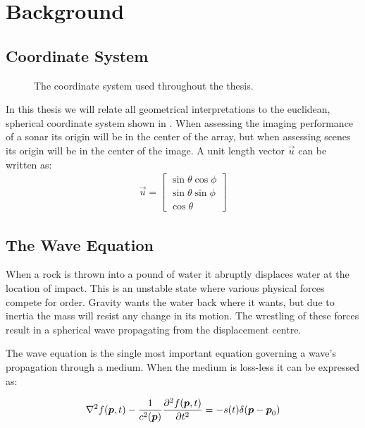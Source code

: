 \chapter{Background}


\section{Coordinate System}

\begin{figure}[th]
\caption{The coordinate system used throughout the thesis.}\label{geometry}
\end{figure}

In this thesis we will relate all geometrical interpretations to the euclidean, spherical coordinate system shown in . When assessing the imaging performance of a sonar its origin will be in the center of the array, but when assessing scenes its origin will be in the center of the image. A unit length vector $\vec u$ can be written as:
%
\begin{align*}
\vec u =
\begin{bmatrix}
\sin\theta \cos\phi \\
\sin\theta \sin\phi \\
\cos\theta
\end{bmatrix}
\end{align*}
%





\section{The Wave Equation}

When a rock is thrown into a pound of water it abruptly displaces water at the location of impact. This is an unstable state where various physical forces compete for order. Gravity wants the water back where it wants, but due to inertia the mass will resist any change in its motion. The wrestling of these forces result in a spherical wave propagating from the displacement centre. 

The wave equation is the single most important equation governing a wave's propagation through a medium. When the medium is loss-less it can be expressed as:

\begin{align*}
\nabla^2 f(\boldsymbol{p},t) - \frac{1}{c^2(\boldsymbol{p})}\frac{\partial^2 f(\boldsymbol{p},t)}{\partial t^2} = -s(t) \delta(\boldsymbol{p}-\boldsymbol{p}_0)
\end{align*}

